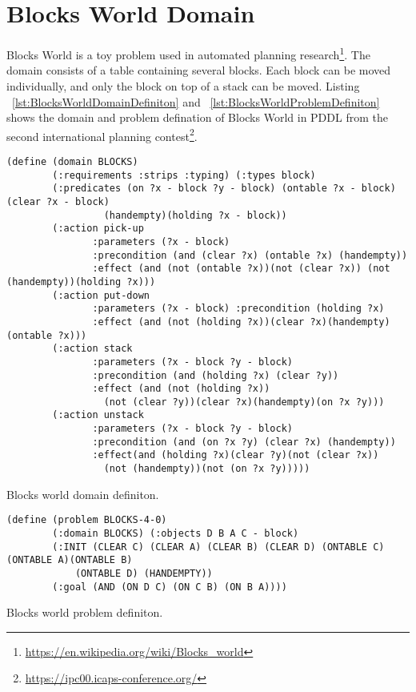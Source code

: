 \chapter{Blocks World Domain}
\label{appendix:blocksWorldDomain}
Blocks World is a toy problem used in automated planning research\footnote{\url{https://en.wikipedia.org/wiki/Blocks_world}}.
The domain consists of a table containing several blocks. Each block can be moved individually, and only the block on top of a stack can be moved. Listing ~\ref{lst:BlocksWorldDomainDefiniton} and ~\ref{lst:BlocksWorldProblemDefiniton} shows the domain and problem defination of Blocks World in PDDL from the second international planning contest\footnote{\url{https://ipc00.icaps-conference.org/}}.

\begin{Listing}
    \begin{lstlisting}[language=PDDL]
    (define (domain BLOCKS)
        (:requirements :strips :typing) (:types block)
        (:predicates (on ?x - block ?y - block) (ontable ?x - block)(clear ?x - block)
                 (handempty)(holding ?x - block))
        (:action pick-up
               :parameters (?x - block)
               :precondition (and (clear ?x) (ontable ?x) (handempty))
               :effect (and (not (ontable ?x))(not (clear ?x)) (not (handempty))(holding ?x)))
        (:action put-down
               :parameters (?x - block) :precondition (holding ?x)
               :effect (and (not (holding ?x))(clear ?x)(handempty)(ontable ?x)))
        (:action stack
               :parameters (?x - block ?y - block)
               :precondition (and (holding ?x) (clear ?y))
               :effect (and (not (holding ?x))
                 (not (clear ?y))(clear ?x)(handempty)(on ?x ?y)))
        (:action unstack
               :parameters (?x - block ?y - block)
               :precondition (and (on ?x ?y) (clear ?x) (handempty))
               :effect(and (holding ?x)(clear ?y)(not (clear ?x))
                 (not (handempty))(not (on ?x ?y)))))
  \end{lstlisting}
    \caption{Blocks world domain definiton.}
    \label{lst:BlocksWorldDomainDefiniton}
\end{Listing}

\begin{Listing}
    \begin{lstlisting}[language=PDDL]
    (define (problem BLOCKS-4-0)
        (:domain BLOCKS) (:objects D B A C - block)
        (:INIT (CLEAR C) (CLEAR A) (CLEAR B) (CLEAR D) (ONTABLE C) (ONTABLE A)(ONTABLE B) 
            (ONTABLE D) (HANDEMPTY))
        (:goal (AND (ON D C) (ON C B) (ON B A))))
  \end{lstlisting}
    \caption{Blocks world problem definiton.}
    \label{lst:BlocksWorldProblemDefiniton}
\end{Listing}